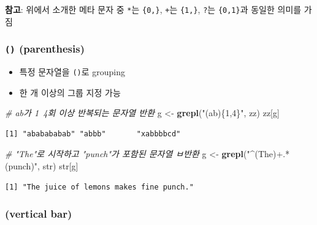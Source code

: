 \documentclass[
  11pt,
]{krantz}
\newenvironment{Shaded}{\begin{snugshade}}{\end{snugshade}}
\newcommand{\CommentTok}[1]{\textcolor[rgb]{0.37,0.37,0.37}{\textit{#1}}}
\newcommand{\KeywordTok}[1]{\textcolor[rgb]{0.27,0.27,0.27}{\textbf{#1}}}
\newcommand{\NormalTok}[1]{#1}
\newcommand{\StringTok}[1]{\textcolor[rgb]{0.5,0.5,0.5}{#1}}
\providecommand{\tightlist}{%
  \setlength{\itemsep}{0pt}\setlength{\parskip}{0pt}}
\let\BeginKnitrBlock\begin \let\EndKnitrBlock\end
\begin{document}
\normalsize

\footnotesize

\BeginKnitrBlock{rmdnote}
\textbf{참고}: 위에서 소개한 메타 문자 중 \texttt{*}는 \texttt{\{0,\}}, \texttt{+}는 \texttt{\{1,\}}, \texttt{?}는 \texttt{\{0,1\}}과 동일한 의미를 가짐
\EndKnitrBlock{rmdnote}

\normalsize

\hypertarget{parenthesis}{%
\subsubsection*{\texorpdfstring{\textbf{\texttt{()} (parenthesis)}}{() (parenthesis)}}\label{parenthesis}}


\begin{itemize}
\tightlist
\item
  특정 문자열을 \texttt{()}로 grouping
\item
  한 개 이상의 그룹 지정 가능
\end{itemize}

\footnotesize

\begin{Shaded}
\begin{Highlighting}[]
\CommentTok{# ab가 1~4회 이상 반복되는 문자열 반환}
\NormalTok{g <-}\StringTok{ }\KeywordTok{grepl}\NormalTok{(}\StringTok{"(ab)\{1,4\}"}\NormalTok{, zz)}
\NormalTok{zz[g]}
\end{Highlighting}
\end{Shaded}

\begin{verbatim}
[1] "ababababab" "abbb"       "xabbbbcd"  
\end{verbatim}

\begin{Shaded}
\begin{Highlighting}[]
\CommentTok{# "The"로 시작하고  "punch"가 포함된 문자열 ㅂ반환}
\NormalTok{g <-}\StringTok{ }\KeywordTok{grepl}\NormalTok{(}\StringTok{"^(The)+.*(punch)"}\NormalTok{, str)}
\NormalTok{str[g]}
\end{Highlighting}
\end{Shaded}

\begin{verbatim}
[1] "The juice of lemons makes fine punch."
\end{verbatim}

\normalsize

\hypertarget{vertical-bar}{%
\subsubsection*{\texorpdfstring{\textbf{\texttt{\textbar{}} (vertical bar)}}{\textbar{} (vertical bar)}}\label{vertical-bar}}
\end{document}
